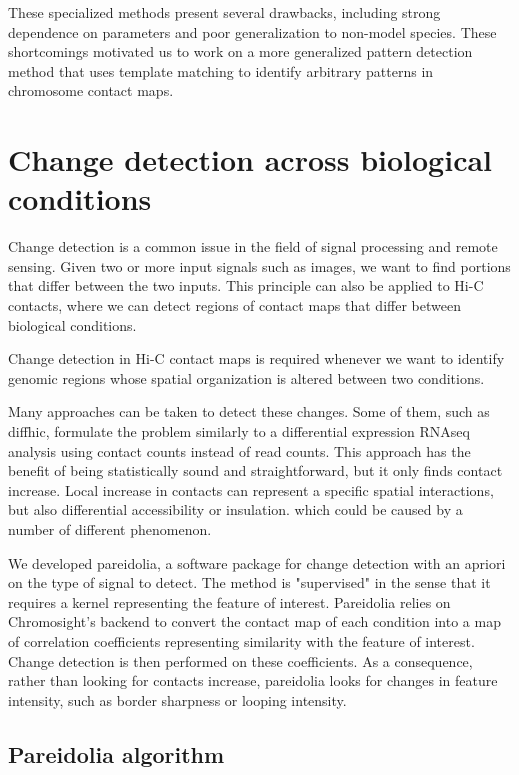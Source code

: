 These specialized methods present several drawbacks, including strong dependence on parameters and poor generalization to non-model species. These shortcomings motivated us to work on a more generalized pattern detection method that uses template matching to identify arbitrary patterns in chromosome contact maps.

\section{Change detection across biological conditions}

Change detection is a common issue in the field of signal processing and remote sensing. Given two or more input signals such as images, we want to find portions that differ between the two inputs. This principle can also be applied to Hi-C contacts, where we can detect regions of contact maps that differ between biological conditions.

Change detection in Hi-C contact maps is required whenever we want to identify genomic regions whose spatial organization is altered between two conditions.

Many approaches can be taken to detect these changes. Some of them, such as diffhic, formulate the problem similarly to a differential expression RNAseq analysis using contact counts instead of read counts. This approach has the benefit of being statistically sound and straightforward, but it only finds contact increase. Local increase in contacts can represent a specific spatial interactions, but also differential accessibility or insulation. which could be caused by a number of different phenomenon.

We developed pareidolia, a software package for change detection with an apriori on the type of signal to detect. The method is "supervised" in the sense that it requires a kernel representing the feature of interest. Pareidolia relies on Chromosight's backend to convert the contact map of each condition into a map of correlation coefficients representing similarity with the feature of interest. Change detection is then performed on these coefficients. As a consequence, rather than looking for contacts increase, pareidolia looks for changes in feature intensity, such as border sharpness or looping intensity.

\subsection{Pareidolia algorithm}

